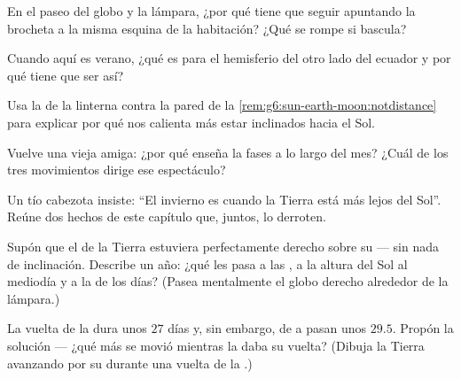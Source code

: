 \begin{exercise}[$\star$]\label{exo:g6:sun-earth-moon:5}
En el paseo del globo y la lámpara, ¿por qué tiene que seguir
apuntando la brocheta a la misma esquina de la habitación? ¿Qué se
rompe si bascula?
\end{exercise}

\begin{exercise}[$\star$]\label{exo:g6:sun-earth-moon:6}
Cuando aquí es verano, ¿qué  es para el hemisferio del otro
lado del ecuador y por qué tiene que ser así?
\end{exercise}

\begin{exercise}[$\star$]\label{exo:g6:sun-earth-moon:7}
Usa la  de la linterna contra la pared de la
\cref{rem:g6:sun-earth-moon:notdistance} para explicar por qué nos
calienta más estar inclinados hacia el Sol.
\end{exercise}

\begin{exercise}[$\star$]\label{exo:g6:sun-earth-moon:8}
Vuelve una vieja amiga: ¿por qué enseña la  fases a lo largo
del mes? ¿Cuál de los tres movimientos dirige ese espectáculo?
\end{exercise}

\begin{exercise}[$\star\star$]\label{exo:g6:sun-earth-moon:9}
Un tío cabezota insiste: ``El invierno es cuando la Tierra está más
lejos del Sol''. Reúne dos hechos de este capítulo que, juntos, lo
derroten.
\end{exercise}

\begin{exercise}[$\star\star$]\label{exo:g6:sun-earth-moon:10}
Supón que el  de la Tierra estuviera perfectamente derecho sobre
su  --- sin nada de inclinación. Describe un año: ¿qué les
pasa a las , a la altura del Sol al mediodía y a la
 de los días? (Pasea mentalmente el globo derecho alrededor de
la lámpara.)
\end{exercise}

\begin{exercise}[$\star\star$]\label{exo:g6:sun-earth-moon:11}
La vuelta de la  dura unos $27$ días y, sin embargo, de
 a  pasan unos $29.5$. Propón la solución
--- ¿qué más se movió mientras la  daba su vuelta? (Dibuja la
Tierra avanzando por su  durante una vuelta de la .)
\end{exercise}

